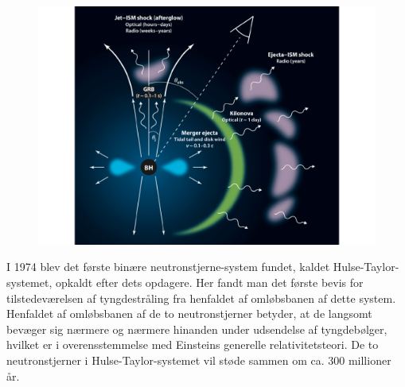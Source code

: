 \documentclass[twocolumn]{article}
\begin{document}
\begin{figure}
\includegraphics[width=\columnwidth]{KN_scematic_berger.pdf}
\end{figure}

I 1974 blev det første binære neutronstjerne-system fundet, kaldet Hulse-Taylor-systemet, opkaldt efter dets opdagere. Her fandt man det første bevis for tilstedeværelsen af tyngdestråling fra henfaldet af omløbsbanen af dette system. %
Henfaldet af omløbsbanen af de to neutronstjerner betyder, at de langsomt bevæger sig nærmere og nærmere hinanden under udsendelse af tyngdebølger, hvilket er i overensstemmelse med Einsteins generelle relativitetsteori. De to neutronstjerner i Hulse-Taylor-systemet vil støde sammen om ca. 300 millioner år.
\end{document}
